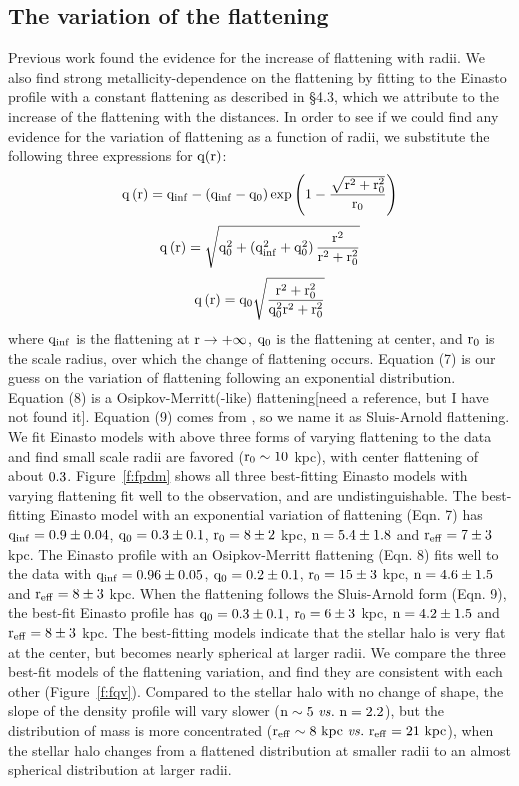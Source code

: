 \documentclass[12pt,preprint]{aastex}
\begin{document}
\subsection{The variation of the flattening}
Previous work found the evidence for the increase of flattening with radii\citep{Preston1991}. We also find strong metallicity-dependence on the flattening by fitting to the Einasto profile with a constant flattening as described in \S 4.3, which we attribute to the increase of the flattening with the distances. In order to see if we could find any evidence for the variation of flattening as a function of radii, we substitute the following three expressions for $\rm q(r)$:
\begin{equation}
\rm q\left(r\right)=q_{inf}-\left(q_{inf}-q_0\right)exp\left(1-\frac{\sqrt{r^2+r_0^2}}{r_0}\right)
\end{equation}
\begin{equation}
\rm q\left(r\right)=\sqrt{q_0^2+\left(q_{inf}^2+q_0^2\right)\frac{r^2}{r^2+r_0^2}}
\end{equation}
\begin{equation}
\rm q\left(r\right)=q_0\sqrt{\frac{r^2+r_0^2}{q_0^2r^2+r_0^2}}
\end{equation}
where $\rm q_{inf}$ is the flattening at $\rm r\rightarrow+\infty$, $\rm q_0$ is the flattening at center, and $\rm r_0$ is the scale radius, over which the change of flattening occurs. Equation (7) is our guess on the variation of flattening following an exponential distribution. Equation (8) is a Osipkov-Merritt(-like) flattening[need a reference, but I have not found it]. Equation (9) comes from \citet{Sluis1998}, so we name it as Sluis-Arnold flattening. We fit Einasto models with above three forms of varying flattening to the data and find small scale radii are favored ($\rm r_0 \sim 10~$kpc), with center flattening of about $\rm 0.3$. Figure~\ref{f:fpdm} shows all three best-fitting Einasto models with varying flattening fit well to the observation, and are undistinguishable. The best-fitting Einasto model with an exponential variation of flattening (Eqn. 7) has $\rm q_{inf}=0.9\pm0.04$, $\rm q_0=0.3\pm0.1$, $\rm r_0=8\pm2~$kpc, $\rm n=5.4\pm1.8$ and $\rm r_{eff}=7\pm3~$kpc. The Einasto profile with an Osipkov-Merritt flattening (Eqn. 8) fits well to the data with $\rm q_{inf}=0.96\pm0.05$, $\rm q_0=0.2\pm0.1$, $\rm r_0=15\pm3~$kpc, $\rm n=4.6\pm1.5$ and $\rm r_{eff}=8\pm3~$kpc. When the flattening follows the Sluis-Arnold form (Eqn. 9), the best-fit Einasto profile has $\rm q_0=0.3\pm0.1$, $\rm r_0=6\pm3~$kpc, $\rm n=4.2\pm1.5$ and $\rm r_{eff}=8\pm3~$kpc. The best-fitting models indicate that the stellar halo is very flat at the center, but becomes nearly spherical at larger radii. We compare the three best-fit models of the flattening variation, and find they are consistent with each other (Figure~\ref{f:fqv}). Compared to the stellar halo with no change of shape, the slope of the density profile will vary slower ($\rm n\sim5~ \it{vs.} \rm ~n=2.2$), but the distribution of mass is more concentrated ($\rm r_{eff}\sim8~kpc~ \it{vs.}~ \rm r_{eff}=21~kpc$), when the stellar halo changes from a flattened distribution at smaller radii to an almost spherical distribution at larger radii.
\end{document}
